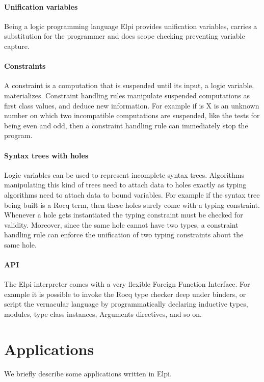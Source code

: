 \documentclass[sigplan,natbib=false]{acmart}
\begin{document}
\paragraph{Unification variables} Being a logic programming language Elpi
provides unification variables, carries a substitution for the programmer
and does scope checking preventing variable capture.

\paragraph{Constraints} A constraint is a computation that is suspended
until its input, a logic variable, materializes. Constraint handling rules manipulate
suspended computations as first class values, and deduce new information.
For example if is X is an unknown number on which two incompatible
computations are suspended, like the tests for being even and odd, then a
constraint handling rule can immediately stop the program.

\paragraph{Syntax trees with holes} Logic variables can be used to represent
incomplete syntax trees. Algorithms manipulating this kind of trees need
to attach data to holes exactly as typing algorithms need to attach data to
bound variables. For example if the syntax tree being built is a Rocq term, then
these holes surely come with a typing constraint.
Whenever a hole gets instantiated the typing constraint must be checked for
validity. Moreover, since the same hole cannot have two types, a constraint
handling rule can enforce the unification of two typing constraints about the same hole.

\paragraph{API} The Elpi interpreter comes with a very flexible Foreign Function
Interface. For example it is possible to invoke the Rocq type checker deep
under binders, or script the vernacular language by programmatically
declaring inductive types, modules, type class instances, Arguments directives,
and so on.

\section{Applications}

We briefly describe some applications written in Elpi.
\end{document}
